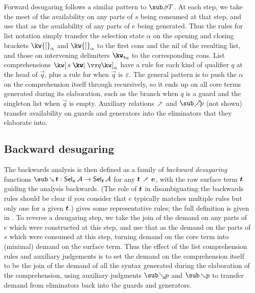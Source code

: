 Forward desugaring follows a similar pattern to $\evalFwdF{T}$. At each step, we take the meet of the availability on any parts of $s$ being consumed at that step, and use that as the availability of any parts of $e$ being generated. Thus the rules for list notation simply transfer the selection state $\alpha$ on the opening and closing brackets $\annot{\kw{[}}{\alpha}$ and $\annot{\kw{]}}{\alpha}$ to the first cons and the nil of the resulting list, and those on intervening delimiters $\annot{\comma}{\alpha}$ to the corresponding cons. List comprehensions $\annListComp{s}{\vec{q}}{\alpha}$ have a rule for each kind of qualifier $q$ at the head of $\vec{q}$, plus a rule for when $\vec{q}$ is $\varepsilon$. The general pattern is to push the $\alpha$ on the comprehension itself through recursively, so it ends up on all core terms generated during its elaboration, such as the  branch when $q$ is a guard and the singleton list when $\vec{q}$ is empty. Auxiliary relations $\clauseFwdR$ and $\totaliseFwdR{p}$ (not shown) transfer availability on guards and generators into the eliminators that they elaborate into.

\subsection{Backward desugaring}

The backwards analysis is then defined as a family of \textit{backward desugaring} functions $\desugarBwdR{\raw{t}}: \Sel{\raw{e}}{A} \to \Sel{\raw{t}}{A}$ for any $\raw{t} \desugarFwdR \raw{e}$, with the raw surface term $\bm{t}$ guiding the analysis backwards. (The role of $\bm{t}$ in disambiguating the backwards rules should be clear if you consider that $e$ typically matches multiple rules but only one for a given $\bm{t}$.)  gives some representative rules; the full definition is {\ifappendices given in  \else \IncludedWithSupplementaryMaterial.\fi} To reverse a desugaring step, we take the join of the demand on any parts of $e$ which were constructed at this step, and use that as the demand on the parts of $s$ which were consumed at this step, turning demand on the core term into (minimal) demand on the surface term. Thus the effect of the list comprehension rules and auxiliary judgements is to set the demand on the comprehension itself to be the join of the demand of all the syntax generated during the elaboration of the comprehension, using auxiliary judgments $\totaliseBwdR{p}$ and $\clauseBwdR{p}$ to transfer demand from eliminators back into the guards and generators.

